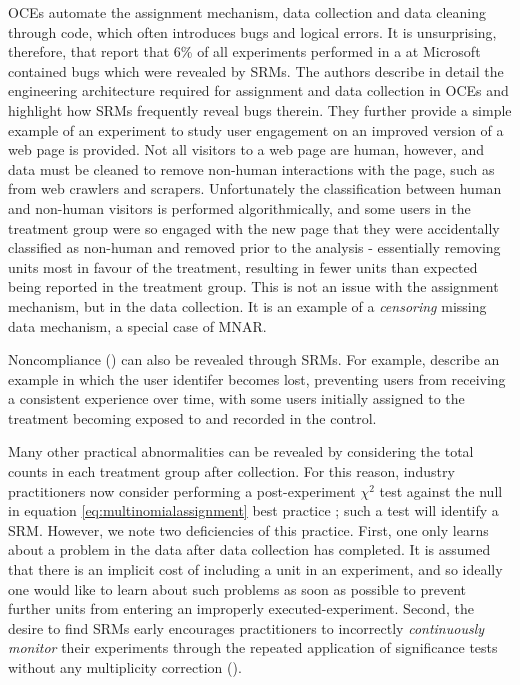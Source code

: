 \documentclass[11pt]{article}
\begin{document}
OCEs automate the assignment mechanism, data collection and data cleaning through code, which often introduces bugs and logical errors.
It is unsurprising, therefore, that \cite{fabijan} report that 6\% of all experiments performed in a at Microsoft contained bugs which were revealed by SRMs.
The authors describe in detail the engineering architecture required for assignment and data collection in OCEs and highlight how SRMs frequently reveal bugs therein.
They further provide a simple example of an experiment to study user engagement on an improved version of a web page is provided.
Not all visitors to a web page are human, however, and data must be cleaned to remove non-human interactions with the page, such as from web crawlers and scrapers.
Unfortunately the classification between human and non-human visitors is performed algorithmically, and some users in the treatment group were so engaged with the new page that they were accidentally classified as non-human and removed prior to the analysis - essentially removing units most in favour of the treatment, resulting in fewer units than expected being reported in the treatment group.
This is not an issue with the assignment mechanism, but in the data collection.
It is an example of a \textit{censoring} missing data mechanism, a special case of MNAR.

Noncompliance (\cite{imbens}) can also be revealed through SRMs. For example, \cite{zhao} describe an example in which the user identifer becomes lost, preventing users from receiving a consistent experience over time, with some users initially assigned to the treatment becoming exposed to and recorded in the control.


Many other practical abnormalities can be revealed by considering the total counts in each treatment group after collection.
For this reason, industry practitioners now consider performing a post-experiment $\chi^2$ test against the null in equation \eqref{eq:multinomialassignment} best practice \citep{linkedin}; such a test will identify a SRM.
However, we note two deficiencies of this practice.
First, one only learns about a problem in the data after data collection has completed.
It is assumed that there is an implicit cost of including a unit in an experiment, and so ideally one would like to learn about such problems as soon as possible to prevent further units from entering an improperly executed-experiment.
Second, the desire to find SRMs early encourages practitioners to incorrectly \textit{continuously monitor} their experiments through the repeated application of significance tests without any multiplicity correction (\cite{armitage}).
\end{document}
